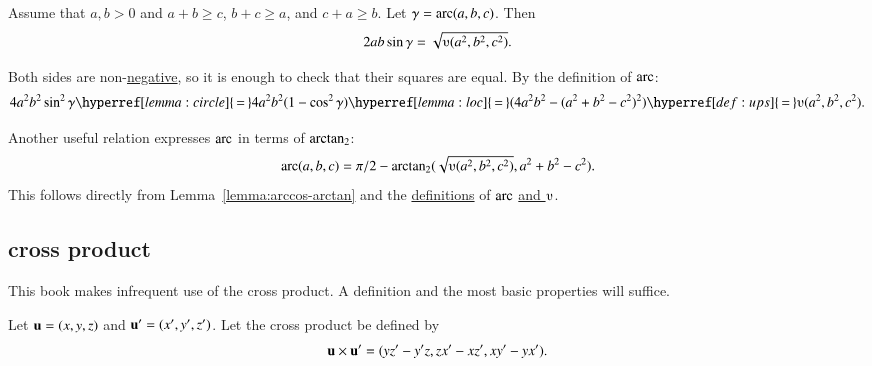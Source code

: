 \begin{lemma}\label{lemma:los}
Assume that $a,b>0$ and $a+b\ge c$, $b+c\ge a$, and $c+a\ge b$.
Let $\gamma=\operatorname{arc}(a,b,c)$.  Then
\begin{displaymath}2 a b \sin\gamma =
  \sqrt{\ups(a^2,b^2,c^2)}.\end{displaymath}
\end{lemma}
%
%
%
\begin{proved}
  Both sides are non-\hyperref[lemma:sin-pos]{negative}, so it is
  enough to check that their squares are equal.  By the definition of
  $\operatorname{arc}$:
\begin{displaymath}
4 a^2 b^2 \sin^2\gamma 
\hyperref[lemma:circle]{\,=\,} 4 a^2 b^2 (1-\cos^2\gamma) 
\hyperref[lemma:loc]{\,=\,} (4 a^2 b^2 - (a^2 + b^2 -
c^2)^2) 
\hyperref[def:ups]{\,=\,} \ups(a^2,b^2,c^2).\end{displaymath}
\swallowed\end{proved}

Another useful relation expresses $\operatorname{arc}$ in terms of ${\operatorname{arctan_2}}$:
\begin{equation}\label{eqn:arc-atn}
\arc(a,b,c) = 
\pi/2 - \atn({\sqrt{\ups(a^2,b^2,c^2)}},{ a^2 + b^2 - c^2}).
\end{equation}
This follows directly from Lemma~\ref{lemma:arccos-arctan} and the
\hyperref[def:arc]{definitions} of $\operatorname{arc}$ \hyperref[def:ups]{and
  $\ups$}.



\subsection{cross product} 

This book makes infrequent use of the cross product.
A definition and the most basic properties will suffice.

\begin{definition}\label{def:cross}   
Let ${\mathbf u} =(x,y,z)$ and ${\mathbf u}' = (x',y',z')$.  
Let the cross product be defined
by
\begin{displaymath}
{\mathbf u} \times {\mathbf u}' = (y z' - y' z, z x' - x z', x y' - y x').
\end{displaymath}
%
%
%
\end{definition}

